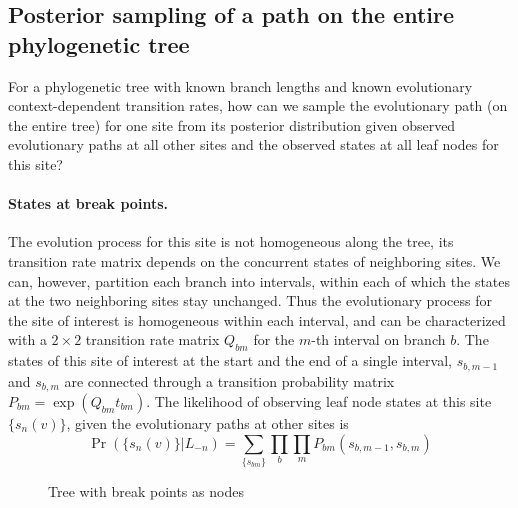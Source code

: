 \documentclass[11pt]{article}
\begin{document}
\subsection{Posterior sampling of a path on the entire phylogenetic tree}
For a phylogenetic tree with known branch lengths and known
evolutionary context-dependent transition rates, how can we sample the
evolutionary path (on the entire tree) for one site from its posterior
distribution given observed evolutionary paths at all other sites and the
observed states at all leaf nodes for this site?

\paragraph{States at break points.}
The evolution process for this site is not homogeneous along the tree,
its transition rate matrix depends on the concurrent states of
neighboring sites. We can, however, partition each branch into
intervals, within each of which the states at the two neighboring
sites stay unchanged. Thus the evolutionary process for the site of
interest is homogeneous within each interval, and can be characterized
with a $2\times2$ transition rate matrix $Q_{bm}$ for the $m$-th
interval on branch $b$. The states of this site of interest at the
start and the end of a single interval, $s_{b,m-1}$ and $s_{b,m}$ are
connected through a transition probability matrix $P_{bm} =
\exp(Q_{bm}t_{bm})$.
The likelihood of observing leaf node states at this site
$\{s_n(v)\}$, given the evolutionary paths at other sites is
\[
\Pr(\{s_n(v)\} | L_{-n}) = \sum\limits_{\{s_{bm}\}} \prod\limits_{b} \prod\limits_{m} P_{bm}(s_{b,m-1}, s_{b, m})
\]

\begin{figure}\label{fig:treebreak}
  \caption{Tree with break points as nodes}
\end{figure}
\end{document}
